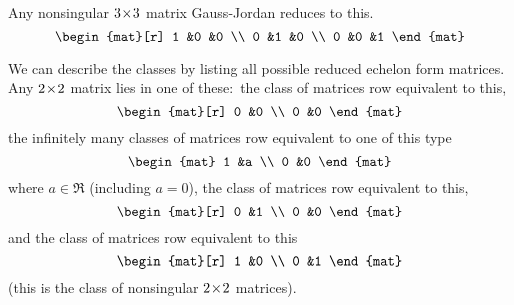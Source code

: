 \begin{example}
Any nonsingular \( 3 \! \times \! 3 \) matrix Gauss-Jordan reduces to this.
\begin{equation*}
    \begin{mat}[r]
      1  &0  &0 \\
      0  &1  &0 \\
      0  &0  &1
    \end{mat}
\end{equation*}
\end{example}

\begin{example} \label{ex:RowEqClassTwoTwoMats}
We can describe the classes by listing all possible
reduced echelon form matrices.
Any $2 \! \times \! 2$ matrix lies in one of these:~the class of matrices
row equivalent to this,
\begin{equation*}
  \begin{mat}[r]
     0  &0  \\
     0  &0
  \end{mat}
\end{equation*}
the infinitely many classes of matrices row equivalent to one of this type
\begin{equation*}
  \begin{mat}
     1  &a  \\
     0  &0
  \end{mat}
\end{equation*}
where \( a\in\Re \) (including $a=0$),
the class of matrices row equivalent to this,
\begin{equation*}
  \begin{mat}[r]
     0  &1  \\
     0  &0
  \end{mat}
\end{equation*}
and the class of matrices row equivalent to this
\begin{equation*}
  \begin{mat}[r]
     1  &0  \\
     0  &1
  \end{mat}
\end{equation*}
(this is the class of nonsingular $2 \! \times \! 2$ matrices).
\end{example}



